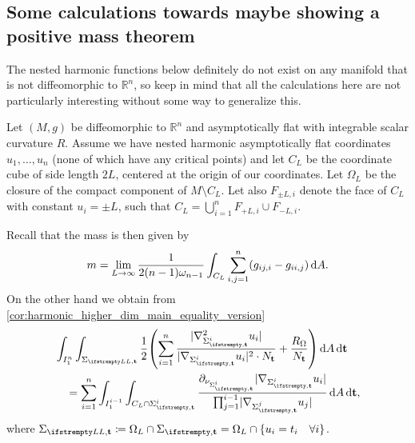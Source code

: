 \documentclass[draft]{amsart}
\newcommand*{\mathcomma}{,}
\newcommand*{\mathfullstop}{.}
\DeclarePairedDelimiter{\parens}{(}{)}
\let\p\parens %
\newcommand*{\definedas}{\coloneqq}
\newcommand*{\goesto}{\to}
\newcommand*{\reals}{\mathbb{R}}
\DeclarePairedDelimiter{\abs}{\lvert}{\rvert} %
\begin{document}
\subsection{Some calculations towards maybe showing a positive mass theorem}
The nested harmonic functions below  definitely do not exist on any manifold that is not diffeomorphic to \( \reals^n \), so keep in mind that all the calculations here are not particularly interesting without some way to generalize this.

Let \( (M,g) \) be diffeomorphic to \( \reals^n \) and asymptotically flat with integrable scalar curvature \( R \). Assume we have nested harmonic asymptotically flat coordinates \( u_1,\dotsc,u_n \) (none of which have any critical points) and let \( C_L \) be the coordinate cube of side length \( 2 L \), centered at the origin of our coordinates. Let \( \Omega_L \) be the closure of the compact component of \( M\setminus C_L \). Let also \( F_{\pm L,i} \) denote the face of \( C_L \) with constant \( u_i=\pm L \), such that \( C_{L}=\bigcup_{i=1}^n F_{+L,i}\cup F_{-L,i} \).

Recall that the mass is then given by
\begin{equation*}
    m=\lim_{L \goesto \infty}\frac{1}{2(n-1)\omega_{n-1}}\int_{C_L}\sum_{i,j=1}^{n}(g_{ij,i}-g_{ii,j})\odif{A}\mathfullstop
\end{equation*}
On the other hand we obtain from \cref{cor:harmonic_higher_dim_main_equality_version}
\begin{equation}
    \begin{aligned}
        &\int_{I_1^n}\int_{\nls[L]}\frac{1}{2}\p*{\sum_{i=1}^{n}\frac{\abs{\nabla_{\nls^i}^2 u_i}}{\abs{\nabla_{\nls^i}u_i}^2\cdot N_{\vect{t}}}+\frac{R_\Omega}{N_{\vect{t}}}}\odif{A}\odif{\vect{t}}\\
        &\quad=\sum_{i=1}^{n}\int_{I_1^{i-1}}\int_{C_L\cap \nls^i}\frac{\partial_{\nu_{\nls^i}}\abs{\nabla_{\nls^i}u_i}}{\prod_{j=1}^{i-1}\abs{\nabla_{\nls^j}u_j}}\odif{A}\odif{\vect{t}}\mathcomma
    \end{aligned}
\end{equation}
where \( \nls[L] \definedas \Omega_L \cap \nls=\Omega_L\cap \{u_i=t_i\quad \forall i\} \).
\end{document}
